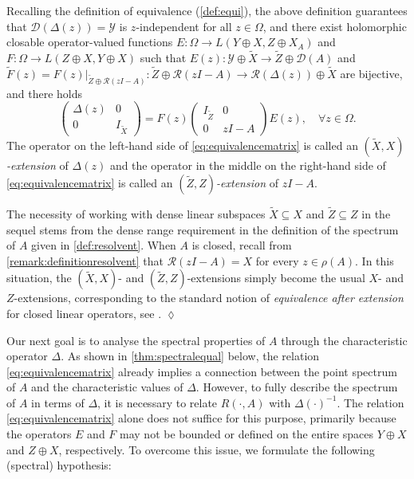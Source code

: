 \documentclass[english]{myarticle}
\begin{document}
\begin{sloppypar}
Recalling the definition of equivalence (\cref{def:equi}), the above definition guarantees that $\mathcal{D}(\Delta(z)) = \mathcal{
Y}$ is $z$-independent for all $z \in \Omega$, and there exist holomorphic closable operator-valued functions $E: \Omega \to L(Y \oplus X,Z \oplus X_A)$ and $F: \Omega \to L(Z \oplus X,Y \oplus X)$ such that $E(z) : \mathcal{Y} \oplus \tilde{X} \to \tilde{Z} \oplus \mathcal{D}(A)$ and $\tilde{F}(z) = F(z)|_{\tilde{Z} \oplus \mathcal{R}(zI-A)} : \tilde{Z} \oplus \mathcal{R}(zI-A) \to \mathcal{R}(\Delta(z)) \oplus \tilde{X}$ are bijective, and there holds
    \begin{equation} \label{eq:equivalencematrix}
        \begin{pmatrix}
            \Delta(z) & 0 \\
            0 & I_{\tilde{X}}
        \end{pmatrix}
        =
        F(z)
        \begin{pmatrix}
            I_{\tilde{Z}}& 0 \\
            0 & zI - A
        \end{pmatrix}
        E(z), \quad \forall z \in \Omega.
\end{equation}
The operator on the left-hand side of \eqref{eq:equivalencematrix} is called an $(\tilde{X},X)$\emph{-extension} of $\Delta(z)$ and the operator in the middle on the right-hand side of \eqref{eq:equivalencematrix} is called an $(\tilde{Z},Z)$\emph{-extension} of $zI-A$.

\begin{remark}
The necessity of working with dense linear subspaces $\tilde{X} \subseteq X$ and $\tilde{Z} \subseteq Z$ in the sequel stems from the dense range requirement in the definition of the spectrum of $A$ given in \cref{def:resolvent}. When $A$ is closed, recall from \cref{remark:definitionresolvent} that $\mathcal{R}(zI-A) = X$ for every $z \in \rho(A)$. In this situation, the $(\tilde{X},X)$- and $(\tilde{Z},Z)$-extensions simply become the usual $X$- and $Z$-extensions, corresponding to the standard notion of \emph{equivalence after extension} for closed linear operators, see \cite[Section 4.4]{Harm2008}. \hfill $\lozenge$
\end{remark}

Our next goal is to analyse the spectral properties of $A$ through the characteristic operator $\Delta$. As shown in \cref{thm:spectralequal} below, the relation \eqref{eq:equivalencematrix} already implies a connection between the point spectrum of $A$ and the characteristic values of $\Delta$. However, to fully describe the spectrum of $A$ in terms of $\Delta$, it is necessary to relate $R(\cdot, A)$ with $\Delta(\cdot)^{-1}$. The relation \eqref{eq:equivalencematrix} alone does not suffice for this purpose, primarily because the operators $E$ and $F$ may not be bounded or defined on the entire spaces $Y \oplus X$ and $Z \oplus X$, respectively. To overcome this issue, we formulate the following (spectral) hypothesis:


\end{sloppypar}
\end{document}
